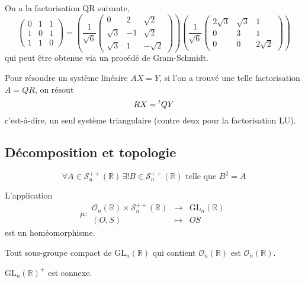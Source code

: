   \begin{example}
    On a la factorisation QR suivante,
    \[ \begin{pmatrix} 0 & 1 & 1 \\ 1 & 0 & 1 \\ 1 & 1 & 0 \end{pmatrix} = \left( \frac{1}{\sqrt{6}} \begin{pmatrix} 0 & 2 & \sqrt{2} \\ \sqrt{3} & -1 & \sqrt{2} \\ \sqrt{3} & 1 & -\sqrt{2} \end{pmatrix} \right) \left( \frac{1}{\sqrt{6}} \begin{pmatrix} 2\sqrt{3} & \sqrt{3} & 1 \\ 0 & 3 & 1 \\ 0 & 0 & 2\sqrt{2} \end{pmatrix} \right) \]
    qui peut être obtenue via un procédé de Gram-Schmidt.
  \end{example}


  \begin{remark}
    Pour résoudre un système linéaire $AX = Y$, si l'on a trouvé une telle factorisation $A = QR$, on résout
    \[ RX = \mathstrut ^t QY \]
    c'est-à-dire, un seul système triangulaire (contre deux pour la factorisation LU).
  \end{remark}

  \subsection{Décomposition et topologie}


  \begin{lemma}
    \[ \forall A \in \mathcal{S}_n^{++}(\mathbb{R}) \, \exists! B \in \mathcal{S}_n^{++}(\mathbb{R}) \text{ telle que } B^2 = A \]
  \end{lemma}


  \begin{theorem}
    L'application
    \[ \mu :
    \begin{array}{ccc}
      \mathcal{O}_n(\mathbb{R}) \times \mathcal{S}_n^{++}(\mathbb{R}) &\rightarrow& \mathrm{GL}_n(\mathbb{R}) \\
      (O, S) &\mapsto& OS
    \end{array}
    \]
    est un homéomorphisme.
  \end{theorem}

  \begin{corollary}
    Tout sous-groupe compact de $\mathrm{GL}_n(\mathbb{R})$ qui contient $\mathcal{O}_n(\mathbb{R})$ est $\mathcal{O}_n(\mathbb{R})$.
  \end{corollary}


  \begin{corollary}
    $\mathrm{GL}_n(\mathbb{R})^+$ est connexe.
  \end{corollary}

